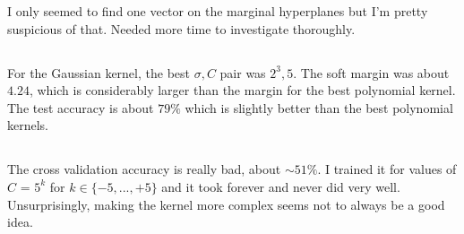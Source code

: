 \documentclass[]{article}
\begin{document}
I only seemed to find one vector on the marginal hyperplanes but I'm pretty suspicious of that. Needed more time to investigate thoroughly.

\subsection{}

For the Gaussian kernel, the best $\sigma, C$ pair was $2^3, 5$. The soft margin was about $ 4.24$, which is considerably larger than the margin for the best polynomial kernel. The test accuracy is about $ 79\%$ which is slightly better than the best polynomial kernels.
\begin{figure}[H]
	\label{fig:plot}
\end{figure}

\subsection{}

The cross validation accuracy is really bad, about $\sim 51\%$. I trained it for values of $C$ = $5^k$ for $k \in \lbrace -5, ..., +5\rbrace$ and it took forever and never did very well. Unsurprisingly, making the kernel more complex seems not to always be a good idea.

\pagebreak

\section{}

\subsection{}
\end{document}
